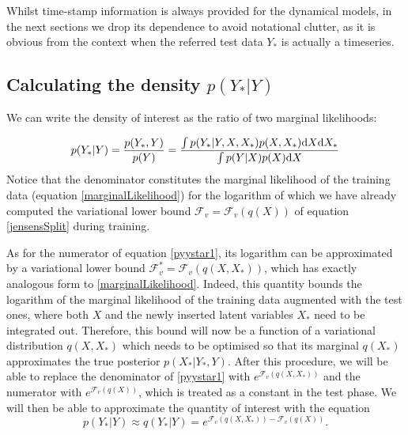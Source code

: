 \documentclass [10pt , a4paper]{article}
\begin{document}
 \par Whilst time-stamp information is always provided for the dynamical models, in the
next sections we drop its dependence to avoid notational clutter, as it is obvious from the context when the
referred test data $Y_*$ is actually a timeseries.






\subsection{\label{predictions1} Calculating the density $p(Y_*|Y)$}

We can write the density of interest as the ratio of two marginal likelihoods:

\begin{equation}
\label{pyystar1}
p(Y_*|Y) = \frac{p(Y_*,Y)}{p(Y)} = \frac{\int p(Y_*|Y, X, X_*) p(X,X_*) \text{d} X \text{d} X_*}{\int p(Y|X) p(X) \text{d} X}
\end{equation}
Notice that the denominator constitutes the marginal likelihood of the training data (equation \eqref{marginalLikelihood}) for
the logarithm of which we have already computed the variational lower bound 
$\mathcal{F}_v = \mathcal{F}_v (q(X))$ of equation \eqref{jensensSplit} during training.


As for the numerator of equation \eqref{pyystar1}, its logarithm can be approximated by a variational lower bound
$\mathcal{F}_v^* = \mathcal{F}_v (q(X,X_*))$, which has exactly analogous form to \eqref{marginalLikelihood}. Indeed,
this quantity bounds the logarithm of the marginal likelihood of the training data augmented with the test ones, where
both $X$ and the newly inserted latent variables $X_*$ need to be integrated out. 
Therefore, this bound will now be a function of a variational distribution $q(X,X_*)$
which needs to be optimised so that its marginal $q(X_*)$ approximates the true posterior $p(X_* | Y_*,Y)$.
After this procedure, we will be able to
replace the denominator of \eqref{pyystar1} with $e^{\mathcal{F}_v (q(X,X_*))}$ and the numerator with $e^{\mathcal{F}_v (q(X))}$,
which is treated as a constant in the test phase. We will then be able to approximate the quantity of interest with the equation
\begin{equation}
\label{pyystar2}
p(Y_*|Y) \approx q(Y_*|Y) = e^{\mathcal{F}_v (q(X,X_*)) - \mathcal{F}_v (q(X))}.
\end{equation}
\end{document}
